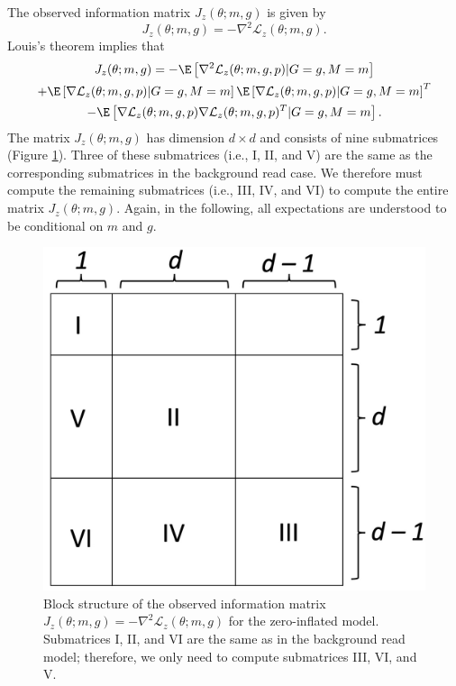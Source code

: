 \documentclass[12pt]{article}
\begin{document}
\begin{appendices}
The observed information matrix $J_z(\theta; m, g)$ is given by
$$ J_z(\theta; m, g) = -\nabla^2 \mathcal{L}_z(\theta; m, g).$$ Louis's theorem implies that
\begin{multline*}
J_z(\theta; m, g) = -\E \left[\nabla^2 \mathcal{L}_z(\theta; m, g, p) | G = g, M = m \right] \\ + \E\left[\nabla \mathcal{L}_z(\theta; m, g, p) | G = g, M = m \right] \E\left[\nabla \mathcal{L}_z(\theta; m, g, p) | G = g, M = m \right]^T \\ - \E\left[\nabla\mathcal{L}_z(\theta; m, g, p) \nabla \mathcal{L}_z(\theta; m, g, p)^T | G = g, M = m \right].
\end{multline*}
The matrix $J_z(\theta; m, g)$ has dimension $d \times d$ and consists of nine submatrices (Figure \ref{infomatrixzeroinf}). Three of these submatrices (i.e., I, II, and V) are the same as the corresponding submatrices in the background read case. We therefore must compute the remaining submatrices (i.e., III, IV, and VI) to compute the entire matrix $J_z(\theta; m, g)$. Again, in the following, all expectations are understood to be conditional on $m$ and $g$.

\begin{figure}
	\centering
	\includegraphics[width=0.45\linewidth]{../../figures/info_matrix/info_matrix_zero_inf}
	\caption{Block structure of the observed information matrix $J_z(\theta; m, g) = -\nabla^2 \mathcal{L}_z(\theta; m, g)$ for the zero-inflated model. Submatrices I, II, and VI are the same as in the background read model; therefore, we only need to compute submatrices III, VI, and V.}
	\label{infomatrixzeroinf}
\end{figure}


\end{appendices}
\end{document}
